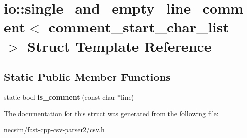 \hypertarget{structio_1_1single__and__empty__line__comment}{}\section{io\+:\+:single\+\_\+and\+\_\+empty\+\_\+line\+\_\+comment$<$ comment\+\_\+start\+\_\+char\+\_\+list $>$ Struct Template Reference}
\label{structio_1_1single__and__empty__line__comment}
\subsection*{Static Public Member Functions}
\begin{DoxyCompactItemize}
\item 
static bool {\bfseries is\+\_\+comment} (const char $\ast$line)\hypertarget{structio_1_1single__and__empty__line__comment_a93a1556dfe4d7e6e3a674d576c4b30f4}{}\label{structio_1_1single__and__empty__line__comment_a93a1556dfe4d7e6e3a674d576c4b30f4}

\end{DoxyCompactItemize}


The documentation for this struct was generated from the following file\+:\begin{DoxyCompactItemize}
\item 
necsim/fast-\/cpp-\/csv-\/parser2/csv.\+h\end{DoxyCompactItemize}

